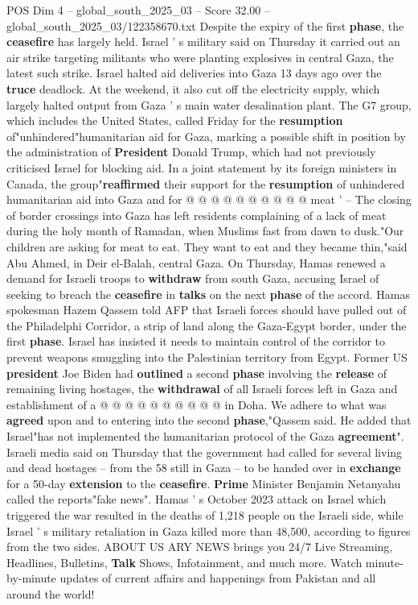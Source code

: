 \begin{textsample}{POS Dim 4 – global\_south\_2025\_03 – Score 32.00 – global\_south\_2025\_03/122358670.txt}
Despite the expiry of the first \textbf{phase}, the \textbf{ceasefire} has largely held.
Israel ' s military said on Thursday it carried out an air strike targeting militants who were planting explosives in central Gaza, the latest such strike.
Israel halted aid deliveries into Gaza 13 days ago over the \textbf{truce} deadlock.
At the weekend, it also cut off the electricity supply, which largely halted output from Gaza ' s main water desalination plant.
The G7 group, which includes the United States, called Friday for the \textbf{resumption} of"unhindered"humanitarian aid for Gaza, marking a possible shift in position by the administration of \textbf{President} Donald Trump, which had not previously criticised Israel for blocking aid.
In a joint statement by its foreign ministers in Canada, the group"\textbf{reaffirmed} their support for the \textbf{resumption} of unhindered humanitarian aid into Gaza and for @ @ @ @ @ @ @ @ @ @ meat ' -- The closing of border crossings into Gaza has left residents complaining of a lack of meat during the holy month of Ramadan, when Muslims fast from dawn to dusk."Our children are asking for meat to eat.
They want to eat and they became thin,"said Abu Ahmed, in Deir el-Balah, central Gaza.
On Thursday, Hamas renewed a demand for Israeli troops to \textbf{withdraw} from south Gaza, accusing Israel of seeking to breach the \textbf{ceasefire} in \textbf{talks} on the next \textbf{phase} of the accord.
Hamas spokesman Hazem Qassem told AFP that Israeli forces should have pulled out of the Philadelphi Corridor, a strip of land along the Gaza-Egypt border, under the first \textbf{phase}.
Israel has insisted it needs to maintain control of the corridor to prevent weapons smuggling into the Palestinian territory from Egypt.
Former US \textbf{president} Joe Biden had \textbf{outlined} a second \textbf{phase} involving the \textbf{release} of remaining living hostages, the \textbf{withdrawal} of all Israeli forces left in Gaza and establishment of a @ @ @ @ @ @ @ @ @ @ in Doha.
We adhere to what was \textbf{agreed} upon and to entering into the second \textbf{phase},"Qassem said.
He added that Israel"has not implemented the humanitarian protocol of the Gaza \textbf{agreement}".
Israeli media said on Thursday that the government had called for several living and dead hostages -- from the 58 still in Gaza -- to be handed over in \textbf{exchange} for a 50-day \textbf{extension} to the \textbf{ceasefire}. \textbf{Prime} Minister Benjamin Netanyahu called the reports"fake news".
Hamas ' s October 2023 attack on Israel which triggered the war resulted in the deaths of 1,218 people on the Israeli side, while Israel ' s military retaliation in Gaza killed more than 48,500, according to figures from the two sides.
ABOUT US ARY NEWS brings you 24/7 Live Streaming, Headlines, Bulletins, \textbf{Talk} Shows, Infotainment, and much more.
Watch minute-by-minute updates of current affairs and happenings from Pakistan and all around the world!


\end{textsample}
